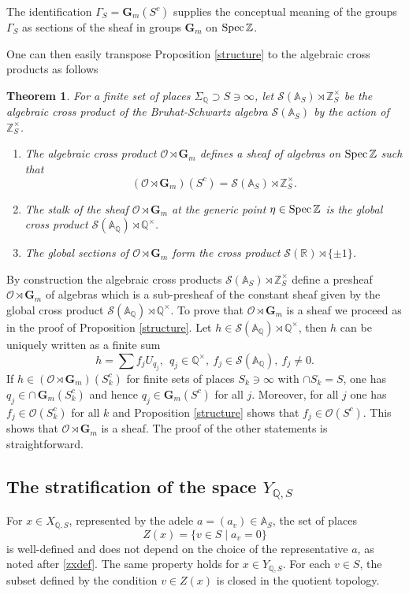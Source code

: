 \documentclass[letterpaper,11pt]{article}
\def\Spec{{\rm Spec\,}}
\def\A{{\mathbb A}}
\def\Q{{\mathbb Q}}
\def\R{\mathbb{R}}
\def\Z{\mathbb{Z}}
\def\cS{\mathcal{S}}
\def\sheaf{{\mathscr{O} }}
\theoremstyle{plain}
\newtheorem{thm}{Theorem}[section]
\begin{document}
The identification 
$ \Gamma_S =\mathbf{G}_m(S^c)$ 
supplies the conceptual meaning of the groups $ \Gamma_S $ as sections of the sheaf in groups $\mathbf{G}_m$  on  $\Spec\Z$. 

One can then easily transpose 
Proposition \ref{structure} to the algebraic cross products as follows 
\begin{thm}\label{structure1} For a finite set of places $\Sigma_\Q\supset S\ni \infty$, let $\cS(\A_S)\rtimes \Z_S^\times$ be the algebraic cross product of the Bruhat-Schwartz algebra $\cS(\A_S)$ by the action of $  \Z_S^\times$. 
 		\begin{enumerate}
 			\item The algebraic cross product $\sheaf\rtimes \mathbf{G}_m$ defines a sheaf  of algebras on  $\Spec\Z$ such that 
 			$$
 			\left(\sheaf\rtimes \mathbf{G}_m\right)(S^c)=\cS(\A_S)\rtimes \Z_S^\times.
 			$$
 			\item The stalk of the sheaf $\sheaf\rtimes \mathbf{G}_m$ at the generic point $\eta\in \Spec\Z$ is the global cross product $\cS(\A_\Q)\rtimes \Q^\times$. 			\item The global sections of $\sheaf\rtimes \mathbf{G}_m$ form the cross product $\cS(\R)\rtimes \{\pm 1\}$.
 		\end{enumerate}
\end{thm}
\proof By construction the algebraic cross products $\cS(\A_S)\rtimes \Z_S^\times$ define a presheaf $\sheaf\rtimes \mathbf{G}_m$ of algebras which is a sub-presheaf of the constant sheaf given by the global cross product $\cS(\A_\Q)\rtimes \Q^\times$. To prove that $\sheaf\rtimes \mathbf{G}_m$ is a sheaf we proceed as in the proof of Proposition \ref{structure}. Let $h\in \cS(\A_\Q)\rtimes \Q^\times$, then $h$ can be uniquely written as a finite sum 
$$
h=\sum f_j U_{q_j}, \ \ q_j\in \Q^\times, \ f_j \in \cS(\A_\Q), \ f_j\neq 0.
$$
If $h\in \left(\sheaf\rtimes \mathbf{G}_m\right)(S_k^c)$ for finite sets of places $S_k\ni \infty$ with $\cap S_k=S$, one has 
$q_j\in \cap \,\mathbf{G}_m(S_k^c)$ and hence $q_j\in \mathbf{G}_m(S^c)$ for all $j$. Moreover, for all $j$ one has $f_j\in \sheaf(S_k^c)$ for all $k$ and Proposition \ref{structure} shows that $f_j\in \sheaf(S^c)$. This shows that $\sheaf\rtimes \mathbf{G}_m$ is a sheaf. The proof of the other statements is straightforward. \endproof


\subsection{The stratification of the space $ Y_{\Q,S} $}\label{sectstrati}
 For $ x \in X_{\Q,S} $, represented by the adele $ a = (a_v) \in \A_S $, the set of places  
\[
Z(x) = \{v \in S \mid a_v = 0\}  
\]  
is well-defined and does not depend on the choice of the representative $ a $, as noted after \eqref{zxdef}. The same property holds for $ x \in Y_{\Q,S} $. For each $ v \in S $, the subset defined by the condition $ v \in Z(x) $ is closed in the quotient topology.  
\end{document}
